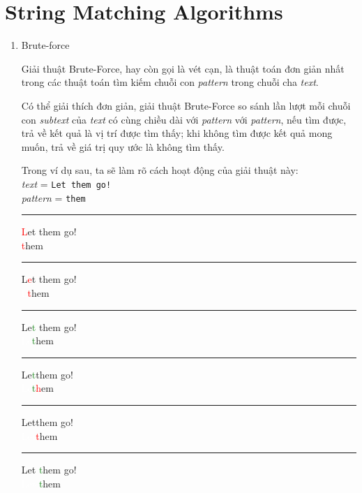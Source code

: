 \documentclass[a4paper,11pt]{article}
\begin{document}
	\section{String Matching Algorithms}
	\begin{enumerate}
		\item Brute-force 
		
			Giải thuật Brute-Force, hay còn gọi là vét cạn, 
			là thuật toán đơn giản nhất trong các thuật toán 
			tìm kiếm chuỗi con \textit{pattern} 
			trong chuỗi cha \textit{text}.

			Có thể giải thích đơn giản, giải thuật Brute-Force 
			so sánh lần lượt mỗi chuỗi con \textit{subtext} của \textit{text} 
			có cùng chiều dài với \textit{pattern} với \textit{pattern}, 
			nếu tìm được, trả về kết quả là vị trí được tìm thấy; khi không 
			tìm được kết quả mong muốn, trả về giá trị quy ước là không tìm thấy.

			Trong ví dụ sau, ta sẽ làm rõ cách hoạt động của giải thuật này:\\
			\textit{text} \hspace*{7mm}= \verb|Let them go!| \\
			\textit{pattern} \hspace*{0.1mm} = \verb|them| 
			\vspace*{4mm}
			\hrule
			\textcolor{red}{L}et them go!\\
			\textcolor{red}{t}hem

			\vspace*{2mm}
			\hrule
			L\textcolor{red}{e}t them go!\\
			\textcolor{white}{L}\textcolor{red}{t}hem
			
			\vspace*{2mm}
			\hrule
			Le\textcolor{ForestGreen}{t} them go!\\
			\textcolor{white}{Le}\textcolor{ForestGreen}{t}hem
			
			\vspace*{2mm}
			\hrule
			Le\textcolor{ForestGreen}{t}\textcolor{red}{\textvisiblespace}them go!\\
			\textcolor{white}{Le}\textcolor{ForestGreen}{t}\textcolor{red}{h}em

			\vspace*{2mm}
			\hrule
			Let\textcolor{red}{\textvisiblespace}them go!\\
			\textcolor{white}{Let}\textcolor{red}{t}hem
			
			\vspace*{2mm}
			\hrule
			Let \textcolor{ForestGreen}{t}hem go!\\
			\textcolor{white}{Let }\textcolor{ForestGreen}{t}hem


\end{enumerate}
\end{document}
